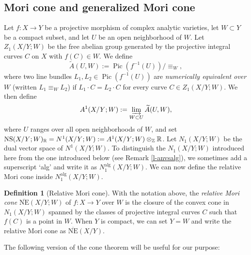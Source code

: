 \documentclass[11pt]{amsart}
\numberwithin{equation}{section}
\theoremstyle{definition}
\theoremstyle{definition}
\theoremstyle{definition}
\newtheorem{definition}[theorem]{Definition}
\begin{document}
\subsection{Mori cone and generalized Mori cone}

Let $f : X \to Y$ be a projective morphism of complex analytic varieties, let
$W \subset Y$ be a compact subset, and let $U$ be an open neighborhood of $W$.
Let $Z_1(X/Y;W)$ be the free abelian group generated by the projective integral
curves $C$ on $X$ with $f(C) \in W$. We define
$$
\widetilde{A}(U, W) := \operatorname{Pic}\!\left(f^{-1}(U)\right) \big/ {\equiv_W},
$$
where two line bundles $L_1, L_2 \in \operatorname{Pic}(f^{-1}(U))$ are \textit{numerically equivalent over $W$} (written $L_1 \equiv_W L_2$) if $L_1 \cdot C = L_2 \cdot C$ for every curve $C \in Z_1(X/Y;W)$. We then define
$$
A^1(X/Y;W) := \varinjlim_{W \subset U} \widetilde{A}(U, W),
$$
where $U$ ranges over all open neighborhoods of $W$, and set ${\rm{NS}}(X/Y;W)_{\mathbb{R}} = N^1(X/Y;W) := A^1(X/Y;W) \otimes_{\mathbb{Z}} \mathbb{R}$. Let $N_1(X/Y;W)$ be the dual vector space of $N^1(X/Y;W)$. To distinguish the $N_1(X / Y ; W)$ introduced here from the one introduced below (see Remark \ref{l-anvsalg}), we sometimes add a superscript `alg' and write it as $N_1^{\text{alg}}(X / Y ; W)$. We can now define the relative Mori cone inside $N_{1}^{\mathrm{alg}}(X/Y;W)$.
\begin{definition}[Relative Mori cone]\label{def-Moricone}
With the notation above, the \textit{relative Mori cone} $\overline{\mathrm{NE}}(X/Y;W)$ of $f : X \to Y$ over $W$ is the closure of the convex cone in $N_1(X/Y;W)$ spanned by the classes of projective integral curves $C$ such that $f(C)$ is a point in $W$. When $Y$ is compact, we can set $Y=W$ and write the relative Mori cone as $\overline{\text{NE}}(X/Y)$.
\end{definition}

The following version of the cone theorem will be useful for our purpose: 
\end{document}
